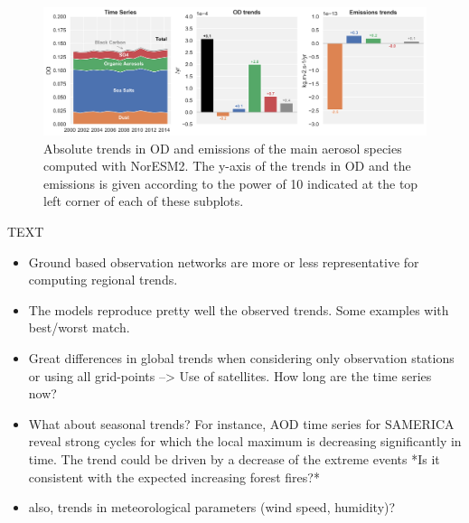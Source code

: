 \documentclass[journal abbreviation, manuscript]{copernicus}
\begin{document}
\begin{figure}[t]
 \includegraphics[width=16cm]{../scripts/figs/abs_species_trends.png}
 \caption{Absolute trends in OD and emissions of the main aerosol species computed with NorESM2. The y-axis of the trends in OD and the emissions is given according to the power of 10 indicated at the top left corner of each of these subplots.}
 \label{species_abs_trends}
\end{figure}




\conclusions  %
TEXT
\begin{itemize}
 \item Ground based observation networks are more or less representative for computing regional trends.
 \item The models reproduce pretty well the observed trends. Some examples with best/worst match.
 \item Great differences in global trends when considering only observation stations or using all grid-points --> Use of satellites. How long are the time series now?
 \item What about seasonal trends? For instance, AOD time series for SAMERICA reveal strong cycles for which the local maximum is decreasing significantly in time. The trend could be driven by a decrease of the extreme events *Is it consistent with the expected increasing forest fires?*
 \item also, trends in meteorological parameters (wind speed, humidity)?
\end{itemize}



\end{document}
